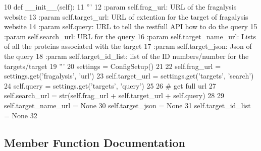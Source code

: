 \begin{DoxyCode}
10     \textcolor{keyword}{def }\_\_init\_\_(self):
11         \textcolor{stringliteral}{'''}
12 \textcolor{stringliteral}{        :param self.frag\_url: URL of the fragalysis website}
13 \textcolor{stringliteral}{        :param self.target\_url: URL of extention for the target of fragalysis website}
14 \textcolor{stringliteral}{        :param self.query: URL to tell the restfull API how to do the query}
15 \textcolor{stringliteral}{        :param self.search\_url: URL for the query }
16 \textcolor{stringliteral}{        :param self.target\_name\_url: Lists of all the proteins associated with the target}
17 \textcolor{stringliteral}{        :param self.target\_json: Json of the query}
18 \textcolor{stringliteral}{        :param self.target\_id\_list: list of the ID numbers/number for the targets/target}
19 \textcolor{stringliteral}{        '''}
20         settings = ConfigSetup()
21 
22         self.frag\_url = settings.get(\textcolor{stringliteral}{'fragalysis'}, \textcolor{stringliteral}{'url'})
23         self.target\_url = settings.get(\textcolor{stringliteral}{'targets'}, \textcolor{stringliteral}{'search'})
24         self.query = settings.get(\textcolor{stringliteral}{'targets'}, \textcolor{stringliteral}{'query'})
25 
26         \textcolor{comment}{# get full url}
27         self.search\_url = str(self.frag\_url + self.target\_url + self.query)
28 
29         self.target\_name\_url = \textcolor{keywordtype}{None}
30         self.target\_json = \textcolor{keywordtype}{None}
31         self.target\_id\_list = \textcolor{keywordtype}{None}
32 
\end{DoxyCode}


\subsection{Member Function Documentation}
\mbox{\label{classfragalysis__api_1_1xcextracter_1_1getdata_1_1_get_targets_data_af26e1f97fa431c2bb490985e7af0eb45}} 
